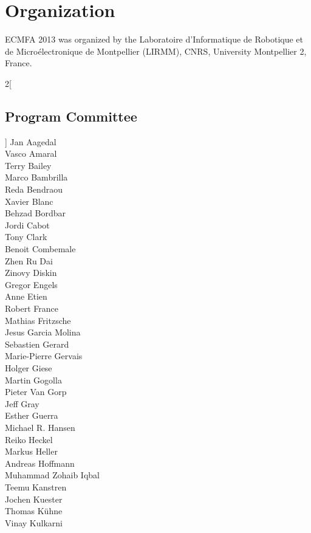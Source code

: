 
\chapter*{Organization}
ECMFA 2013 was organized by the Laboratoire d'Informatique de Robotique et de Micro\'{e}lectronique de Montpellier (LIRMM), CNRS, University Montpellier 2, France.

\begin{multicols}{2}[\section*{Program Committee}]
Jan Aagedal \\
Vasco Amaral \\
Terry Bailey \\
Marco Bambrilla \\
Reda Bendraou \\
Xavier Blanc \\
Behzad Bordbar \\
Jordi Cabot \\
Tony Clark \\
Benoit Combemale \\
Zhen Ru Dai \\
Zinovy Diskin \\
Gregor Engels \\
Anne Etien \\
Robert France \\
Mathias Fritzsche \\
Jesus Garcia Molina \\
Sebastien Gerard \\
Marie-Pierre Gervais \\
Holger Giese \\
Martin Gogolla \\
Pieter Van Gorp \\
Jeff Gray \\
Esther Guerra \\
Michael R. Hansen \\
Reiko Heckel \\
Markus Heller \\
Andreas Hoffmann \\
Muhammad Zohaib Iqbal \\
Teemu Kanstren \\
Jochen Kuester \\
Thomas K\"{u}hne \\
Vinay Kulkarni \\

\end{multicols}
